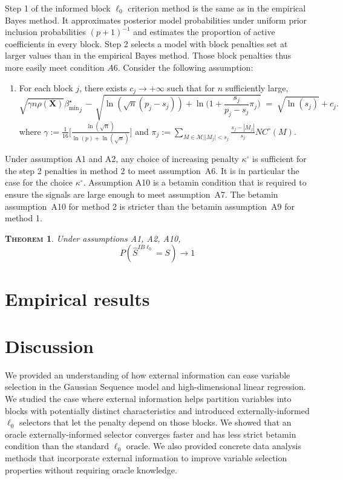 \documentclass[aos]{imsart}
\theoremstyle{plain}
\newtheorem{thm}{\textsc{Theorem}}[section]
\newcommand{\bs}{\boldsymbol}
\begin{document}
Step 1 of the informed block $\ell_0$ criterion method is the same as in the empirical Bayes method. It approximates posterior model probabilities under uniform prior inclusion probabilities $(p+1)^{-1}$ and estimates the proportion of active coefficients in every block. Step 2 selects a model with block penalties set at larger values than in the empirical Bayes method. Those block penalties thus more easily meet condition $A6$. Consider the following assumption:
\begin{enumerate}[start=10,label={(A\arabic*)}]
\item For each block $j$, there exists $c_{j}\to +\infty$ such that for $n$ sufficiently large, %
    \begin{equation*}
        \sqrt{\gamma n\rho(\bs X)}{\beta_{\min}^{\star}}_j \,- \,\sqrt{\ln(\sqrt{n}(p_j-s_j))+\ln\Big(1+\frac{s_j}{p_j-s_j}\pi_j\Big)} \;=\; \sqrt{\ln(s_j)} + c_{j} .
    \end{equation*}
where $\gamma:=\frac{1}{16}\bigg[\frac{\ln(\sqrt{n})}{\ln(p)+\ln(\sqrt{n})}\bigg]$ and 
$\pi_j:=\sum_{M \in \mathcal{M} | |M_j| < s_j}\frac{s_j-|M_j|}{s_j}NC^{\circ}(M)$.
\end{enumerate}
Under assumption A1 and A2, any choice of  increasing penalty $\kappa^{\circ}$ is sufficient for the step 2 penalties in method 2 to meet assumption~A6. It is in particular the case for the choice $\kappa^{\circ}$. Assumption A10 is a betamin condition that is required to ensure the signals are large enough to meet assumption~A7. The betamin assumption~A10 for method 2 is stricter than the betamin assumption~A9 for method 1.

\begin{thm}
    Under assumptions A1, A2, A10, 
$$P(\hat{S}^{IB\ell_0} = S) \to 1$$
\end{thm}

\section{Empirical results}\label{sec:simulation}

\section{Discussion}\label{sec:discussion}

We provided an understanding of how external information can ease variable selection in the Gaussian Sequence model and high-dimensional linear regression. We studied the case where external information helps partition variables into blocks with potentially distinct characteristics and introduced externally-informed $\ell_0$ selectors that let the penalty depend on those blocks. We showed that an oracle externally-informed selector converges faster and has less strict betamin condition than the standard $\ell_0$ oracle. We also provided concrete data analysis methods that incorporate external information to improve variable selection properties without requiring oracle knowledge.
\end{document}
